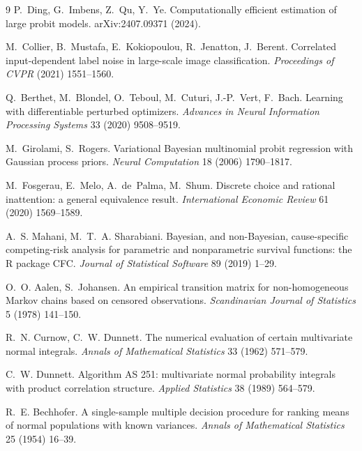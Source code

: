 \documentclass[12pt]{article}
\theoremstyle{remark}
\begin{document}
\begin{thebibliography}{9}
 P.~Ding,
G.~Imbens, Z.~Qu, Y.~Ye. Computationally efficient estimation of large
probit models. arXiv:2407.09371 (2024).

 M.~Collier, B.~Mustafa, E.~Kokiopoulou,
R.~Jenatton, J.~Berent. Correlated input-dependent label noise in
large-scale image classification. \emph{Proceedings of CVPR} (2021)
1551--1560.

 Q.~Berthet, M.~Blondel, O.~Teboul, M.~Cuturi,
J.-P.~Vert, F.~Bach. Learning with differentiable perturbed optimizers.
\emph{Advances in Neural Information Processing Systems} 33 (2020)
9508--9519.

 M.~Girolami,
S.~Rogers. Variational Bayesian multinomial probit regression with
Gaussian process priors. \emph{Neural Computation} 18 (2006) 1790--1817.

 M.~Fosgerau, E.~Melo, A.~de~Palma, M.~Shum. Discrete
choice and rational inattention: a general equivalence result.
\emph{International Economic Review} 61 (2020) 1569--1589.

 A.~S. Mahani,
M.~T.~A. Sharabiani. Bayesian, and non-Bayesian, cause-specific
competing-risk analysis for parametric and nonparametric survival
functions: the R package CFC. \emph{Journal of Statistical Software} 89
(2019) 1--29.

 O.~O. Aalen, S.~Johansen.
An empirical transition matrix for non-homogeneous Markov chains based on
censored observations. \emph{Scandinavian Journal of Statistics} 5
(1978) 141--150.

 R.~N. Curnow, C.~W.
Dunnett. The numerical evaluation of certain multivariate normal
integrals. \emph{Annals of Mathematical Statistics} 33 (1962) 571--579.

 C.~W. Dunnett. Algorithm AS 251:
multivariate normal probability integrals with product correlation
structure. \emph{Applied Statistics} 38 (1989) 564--579.

 R.~E. Bechhofer. A single-sample
multiple decision procedure for ranking means of normal populations with
known variances. \emph{Annals of Mathematical Statistics} 25 (1954)
16--39.


\end{thebibliography}
\end{document}

